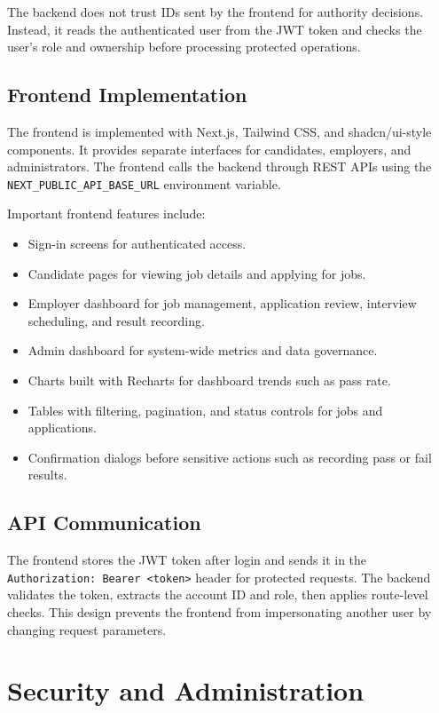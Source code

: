 \documentclass[11pt,a4paper]{report}
\begin{document}
The backend does not trust IDs sent by the frontend for authority decisions. Instead, it reads the authenticated user from the JWT token and checks the user's role and ownership before processing protected operations.

\section{Frontend Implementation}

The frontend is implemented with Next.js, Tailwind CSS, and shadcn/ui-style components. It provides separate interfaces for candidates, employers, and administrators. The frontend calls the backend through REST APIs using the \texttt{NEXT\_PUBLIC\_API\_BASE\_\allowbreak{}URL} environment variable.

Important frontend features include:

\begin{itemize}[leftmargin=1.5cm]
  \item Sign-in screens for authenticated access.
  \item Candidate pages for viewing job details and applying for jobs.
  \item Employer dashboard for job management, application review, interview scheduling, and result recording.
  \item Admin dashboard for system-wide metrics and data governance.
  \item Charts built with Recharts for dashboard trends such as pass rate.
  \item Tables with filtering, pagination, and status controls for jobs and applications.
  \item Confirmation dialogs before sensitive actions such as recording pass or fail results.
\end{itemize}

\section{API Communication}

The frontend stores the JWT token after login and sends it in the \texttt{Authorization: Bearer <token>} header for protected requests. The backend validates the token, extracts the account ID and role, then applies route-level checks. This design prevents the frontend from impersonating another user by changing request parameters.

\chapter{Security and Administration}
\end{document}

